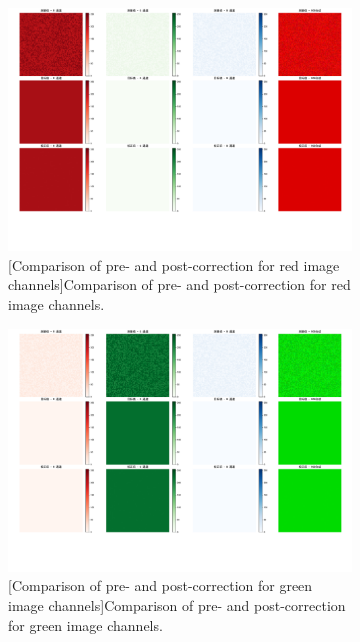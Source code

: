 \begin{figure}[H]
  \centering

  \begin{subfigure}[b]{0.6\textwidth}
    \includegraphics[width=\textwidth]{figures/model_solution/p3/R.pdf}
    [Comparison of pre- and post-correction for red image channels]{Comparison of pre- and post-correction for red image channels.}
    \label{figure4:r_compare}
  \end{subfigure}
  \hfill
  \begin{subfigure}[b]{0.6\textwidth}
    \includegraphics[width=\textwidth]{figures/model_solution/p3/G.pdf}
    [Comparison of pre- and post-correction for green image channels]{Comparison of pre- and post-correction for green image channels.}

\end{subfigure}
\end{figure}
